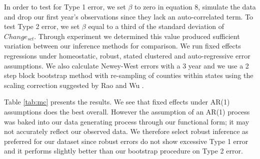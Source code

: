 \documentclass[12pt]{article}
\begin{document}
In order to test for Type 1 error, we set $\beta$ to zero in equation 8, simulate the data and drop our first year's observations since they lack an auto-correlated term. To test Type 2 error, we set $\beta$ equal to a third of the standard deviation of $Change_{sct}$. Through experiment we determined this value produced sufficient variation between our inference methods for comparison. We run fixed effects regressions under homeostatic, robust, stated clustered and auto-regressive error assumptions. We also calculate Newey-West errors with a 3 year and we use a 2 step block bootstrap method with re-sampling of counties within states using the scaling correction suggested by Rao and Wu \cite{rao}. 

Table \ref{tab:mc} presents the results. We see that fixed effects under AR(1) assumptions does the best overall. However the assumption of an AR(1) process was baked into our data generating process through our functional form; it may not accurately reflect our observed data. We therefore select robust inference as preferred for our dataset since robust errors do not show excessive Type 1 error and it performs slightly better than our bootstrap procedure on Type 2 error.
\end{document}
